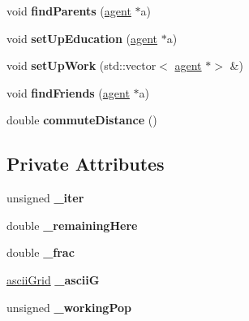 \begin{DoxyCompactItemize}
\item 
\mbox{\label{classpopulationBuilder_a7f881efce32f9db8130c2a249ef848e8}} 
void {\bfseries find\+Parents} (\mbox{\hyperlink{classagent}{agent}} $\ast$a)
\item 
\mbox{\label{classpopulationBuilder_a244b9e0257946a4232d81871ecd64510}} 
void {\bfseries set\+Up\+Education} (\mbox{\hyperlink{classagent}{agent}} $\ast$a)
\item 
\mbox{\label{classpopulationBuilder_ac4bfa711ab996539feed62d07e90a362}} 
void {\bfseries set\+Up\+Work} (std\+::vector$<$ \mbox{\hyperlink{classagent}{agent}} $\ast$$>$ \&)
\item 
\mbox{\label{classpopulationBuilder_a3ed4eec75d5afea0f92f799422cbfab9}} 
void {\bfseries find\+Friends} (\mbox{\hyperlink{classagent}{agent}} $\ast$a)
\item 
\mbox{\label{classpopulationBuilder_ad3cfae964af09027db5332c60a3a4eb7}} 
double {\bfseries commute\+Distance} ()
\end{DoxyCompactItemize}
\subsection*{Private Attributes}
\begin{DoxyCompactItemize}
\item 
\mbox{\label{classpopulationBuilder_a1fe4d46bd4dfdb4dc4a3f5d79b0da405}} 
unsigned {\bfseries \+\_\+iter}
\item 
\mbox{\label{classpopulationBuilder_a90fb547f1060562da92d12ab3b766d44}} 
double {\bfseries \+\_\+remaining\+Here}
\item 
\mbox{\label{classpopulationBuilder_a1e7ee4d3dc120ae768187b223c20352e}} 
double {\bfseries \+\_\+frac}
\item 
\mbox{\label{classpopulationBuilder_abd9d67fdeb86c61aa7ed60dd41095e19}} 
\mbox{\hyperlink{classasciiGrid}{ascii\+Grid}} {\bfseries \+\_\+asciiG}
\item 
\mbox{\label{classpopulationBuilder_a626bdcad8632e6125fbb96b5c4c19fe1}} 
unsigned {\bfseries \+\_\+working\+Pop}
\end{DoxyCompactItemize}


